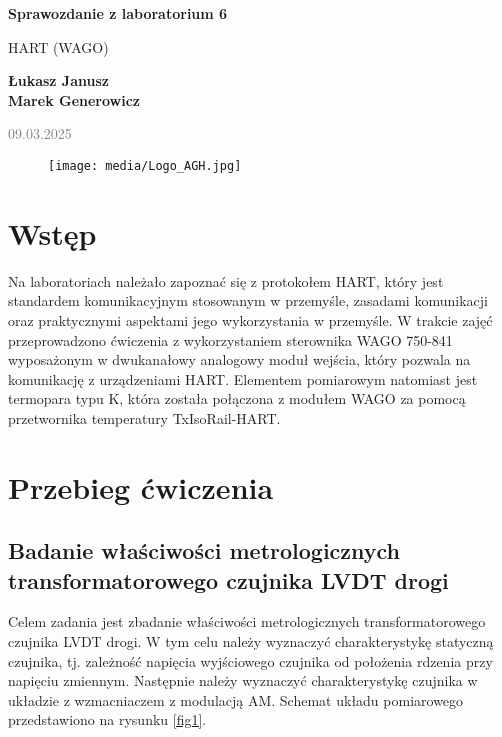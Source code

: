 \documentclass{article}
\begin{document}
\begin{titlepage}
    \begin{center}
        \vspace*{1cm}
            
        \Huge
        \textbf{Sprawozdanie z laboratorium 6}
            
        \vspace{0.5cm}
        \LARGE
        HART (WAGO)
            
        \vspace{1.5cm}
            
        \textbf{Łukasz Janusz\\Marek Generowicz}

        \normalsize      
        \textcolor{gray}{09.03.2025}
        \vfill
        \begin{figure}[hb]
            \centering
            \texttt{[image: media/Logo\_AGH.jpg]}
        \end{figure}
                        
            
    \end{center}
\end{titlepage}

\section{Wstęp}
Na laboratoriach należało zapoznać się z protokołem HART, który jest standardem komunikacyjnym stosowanym w przemyśle, zasadami komunikacji oraz praktycznymi aspektami jego wykorzystania w przemyśle. W trakcie zajęć przeprowadzono ćwiczenia z wykorzystaniem sterownika WAGO 750-841 wyposażonym w dwukanałowy analogowy moduł wejścia, który pozwala na komunikację z urządzeniami HART. Elementem pomiarowym natomiast jest termopara typu K, która została połączona z modułem WAGO za pomocą przetwornika temperatury TxIsoRail-HART. 

\section{Przebieg ćwiczenia}

\subsection{Badanie właściwości metrologicznych transformatorowego czujnika LVDT drogi}

Celem zadania jest zbadanie właściwości metrologicznych transformatorowego czujnika LVDT drogi. W tym celu należy wyznaczyć charakterystykę statyczną czujnika, tj. zależność napięcia wyjściowego czujnika od położenia rdzenia przy napięciu zmiennym. Następnie należy wyznaczyć charakterystykę czujnika w układzie z wzmacniaczem z modulacją AM. Schemat układu pomiarowego przedstawiono na rysunku \ref{fig1}.
\end{document}
